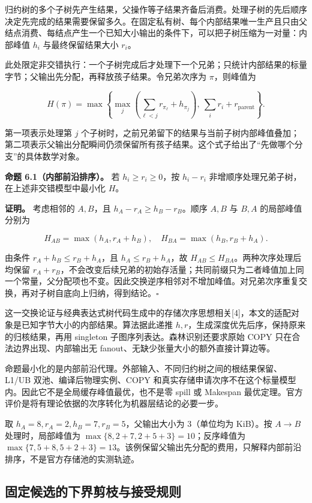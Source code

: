 \documentclass[anonymous,notoc]{gmcm2026}
\begin{document}
归约树的多个子树先产生结果，父操作等子结果齐备后消费。处理子树的先后顺序决定先完成的结果需要保留多久。在固定私有树、每个内部结果唯一生产且只由父结点消费、每结点产生一个已知大小输出的条件下，可以把子树压缩为一对量：内部峰值 \(h_i\) 与最终保留结果大小 \(r_i\)。

此处限定非交错执行：一个子树完成后才处理下一个兄弟；只统计内部结果的标量字节；父输出先分配，再释放孩子结果。令兄弟次序为 \(\pi\)，则峰值为

\[H(\pi)=\max\left\{\max_j\left(\sum_{\ell<j}r_{\pi_\ell}+h_{\pi_j}\right),\ \sum_i r_i+r_{\mathrm{parent}}\right\}.\]

第一项表示处理第 \(j\) 个子树时，之前兄弟留下的结果与当前子树内部峰值叠加；第二项表示父输出分配瞬间仍须保留所有孩子结果。这个式子给出了``先做哪个分支''的具体数学对象。

\textbf{命题 6.1（内部前沿排序）。} 若 \(h_i\ge r_i\ge0\)，按 \(h_i-r_i\) 非增顺序处理兄弟子树，在上述非交错模型中最小化 \(H\)。

\textbf{证明。} 考虑相邻的 \(A,B\)，且 \(h_A-r_A\ge h_B-r_B\)。顺序 \(A,B\) 与 \(B,A\) 的局部峰值分别为

\[H_{AB}=\max(h_A,r_A+h_B),\quad H_{BA}=\max(h_B,r_B+h_A).\]

由条件 \(r_A+h_B\le r_B+h_A\)，且 \(h_A\le r_B+h_A\)，故 \(H_{AB}\le H_{BA}\)。两种次序处理后均保留 \(r_A+r_B\)，不会改变后续兄弟的初始存活量；共同前缀只为二者峰值加上同一个常量，父分配项也不变。因此交换逆序相邻对不增加峰值。对兄弟次序重复交换，再对子树自底向上归纳，得到结论。\(\square\)

这一交换论证与经典表达式树代码生成中的存储次序思想相关{[}4{]}，本文的适配对象是已知字节大小的内部结果。算法据此递推 \(h,r\)，生成深度优先后序，保持原来的归核结果，再用 singleton 子图序列表达。森林识别还要求原始 COPY 只在合法边界出现、内部输出无 fanout、无缺少张量大小的额外直接计算边等。

命题最小化的是内部前沿代理。外部输入、不同归约树之间的根结果保留、L1/UB 双池、编译后物理实例、COPY 和真实存储申请次序不在这个标量模型内。因此它不是全局缓存峰值最优，也不是零 spill 或 Makespan 最优定理。官方评价是将有理论依据的次序转化为机器层结论的必要一步。

取 \(h_A=8,r_A=2,h_B=7,r_B=5\)，父输出大小为 \(3\)（单位均为 KiB）。按 \(A\to B\) 处理时，局部峰值为 \(\max\{8,2+7,2+5+3\}=10\)；反序峰值为 \(\max\{7,5+8,5+2+3\}=13\)。该例保留父输出先分配的费用，只解释内部前沿排序，不是官方存储池的实测轨迹。

\subsection{固定候选的下界剪枝与接受规则}\label{ux56faux5b9aux5019ux9009ux7684ux4e0bux754cux526aux679dux4e0eux63a5ux53d7ux89c4ux5219}
\end{document}
